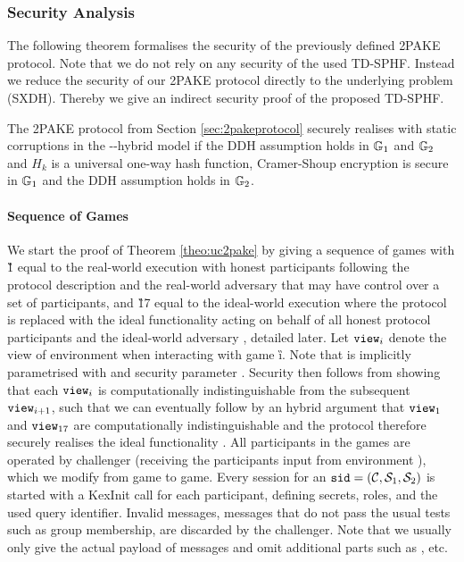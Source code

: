 \subsubsection{Security Analysis}\label{sec:2pakeproof}
The following theorem formalises the security of the previously defined \ac{2PAKE} protocol.
Note that we do not rely on any security of the used \ac{TD-SPHF}.
Instead we reduce the security of our \ac{2PAKE} protocol directly to the underlying problem (\ac{SXDH}).
Thereby we give an indirect security proof of the proposed \ac{TD-SPHF}.
 
\begin{theorem}\label{theo:uc2pake}
  The \ac{2PAKE} protocol from Section \ref{sec:2pakeprotocol} securely realises \FTWOPAKEM with static corruptions in the \Fcrs-\Fca-hybrid model if the \ac{DDH} assumption holds in $\mathbb{G}_1$ and $\mathbb{G}_2$ and $H_k$ is a universal one-way hash function, \ie Cramer-Shoup encryption is secure in $\mathbb{G}_1$ and the \ac{DDH} assumption holds in $\mathbb{G}_2$.
\end{theorem}

\paragraph{Sequence of Games}
We start the proof of Theorem \ref{theo:uc2pake} by giving a sequence of games with \G{1} equal to the real-world execution with honest participants following the protocol description and the real-world adversary \cA that may have control over a set of participants, and \G{17} equal to the ideal-world execution where the protocol is replaced with the ideal functionality \FTWOPAKE acting on behalf of all honest protocol participants and the ideal-world adversary \SIM, detailed later.
Let $\mathtt{view}_i$ denote the view of environment \cZ when interacting with game \G{i}.
Note that \view is implicitly parametrised with \sid and security parameter \secpar.
Security then follows from showing that each $\mathtt{view}_i$ is computationally indistinguishable from the subsequent $\mathtt{view}_{i+1}$, such that we can eventually follow by an hybrid argument that $\mathtt{view}_1$ and $\mathtt{view}_{17}$ are computationally indistinguishable and the protocol therefore securely realises the ideal functionality \FTWOPAKE.
All participants in the games are operated by challenger \Challenger (receiving the participants input from environment \cZ), which we modify from game to game.
Every session for an $\mathtt{sid}=(\mathcal{C}, \mathcal{S}_1, \mathcal{S}_2)$ is started with a KexInit call for each participant, defining secrets, roles, and the used query identifier.
Invalid messages, \ie messages that do not pass the usual tests such as group membership, are discarded by the challenger.
Note that we usually only give the actual payload of messages and omit additional parts such as \sid, \qid etc.

